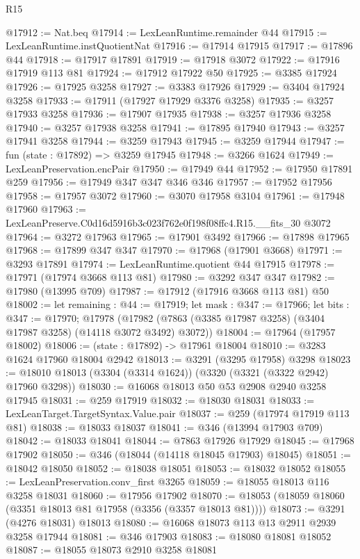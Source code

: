 \begin{lexlean}{R15}
\begin{coremodule}
@17912 := Nat.beq
@17914 := LexLeanRuntime.remainder @44
@17915 := LexLeanRuntime.instQuotientNat
@17916 := @17914 @17915
@17917 := @17896 @44
@17918 := @17917 @17891
@17919 := @17918 @3072
@17922 := @17916 @17919 @113 @81
@17924 := @17912 @17922 @50
@17925 := @3385 @17924
@17926 := @17925 @3258
@17927 := @3383 @17926
@17929 := @3404 @17924 @3258
@17933 := @17911 (@17927 @17929 @3376 @3258)
@17935 := @3257 @17933 @3258
@17936 := @17907 @17935
@17938 := @3257 @17936 @3258
@17940 := @3257 @17938 @3258
@17941 := @17895 @17940
@17943 := @3257 @17941 @3258
@17944 := @3259 @17943
@17945 := @3259 @17944
@17947 := fun (state : @17892) => @3259 @17945
@17948 := @3266 @1624
@17949 := LexLeanPreservation.encPair
@17950 := @17949 @44
@17952 := @17950 @17891 @259
@17956 := @17949 @347 @347 @346 @346
@17957 := @17952 @17956
@17958 := @17957 @3072
@17960 := @3070 @17958 @3104
@17961 := @17948 @17960
@17963 := LexLeanPreserve.C0d16d5916b3c023f762e0f198f08ffc4.R15.__fits_30 @3072
@17964 := @3272 @17963
@17965 := @17901 @3492
@17966 := @17898 @17965
@17968 := @17899 @347 @347
@17970 := @17968 (@17901 @3668)
@17971 := @3293 @17891
@17974 := LexLeanRuntime.quotient @44 @17915
@17978 := @17971 (@17974 @3668 @113 @81)
@17980 := @3292 @347 @347
@17982 := @17980 (@13995 @709)
@17987 := @17912 (@17916 @3668 @113 @81) @50
@18002 := let remaining : @44 := @17919;
  let mask : @347 := @17966;
  let bits : @347 := @17970;
  @17978 (@17982 (@7863 (@3385 @17987 @3258) (@3404 @17987 @3258) (@14118 @3072 @3492) @3072))
@18004 := @17964 (@17957 @18002)
@18006 := (state : @17892) -> @17961 @18004
@18010 := @3283 @1624 @17960 @18004 @2942
@18013 := @3291 (@3295 @17958) @3298
@18023 := @18010 @18013 (@3304 (@3314 @1624)) (@3320 (@3321 (@3322 @2942) @17960 @3298))
@18030 := @16068 @18013 @50 @53 @2908 @2940 @3258 @17945
@18031 := @259 @17919
@18032 := @18030 @18031
@18033 := LexLeanTarget.TargetSyntax.Value.pair
@18037 := @259 (@17974 @17919 @113 @81)
@18038 := @18033 @18037
@18041 := @346 (@13994 @17903 @709)
@18042 := @18033 @18041
@18044 := @7863 @17926 @17929
@18045 := @17968 @17902
@18050 := @346 (@18044 (@14118 @18045 @17903) @18045)
@18051 := @18042 @18050
@18052 := @18038 @18051
@18053 := @18032 @18052
@18055 := LexLeanPreservation.conv_first @3265
@18059 := @18055 @18013 @116 @3258 @18031
@18060 := @17956 @17902
@18070 := @18053 (@18059 @18060 (@3351 @18013 @81 @17958 (@3356 (@3357 @18013 @81))))
@18073 := @3291 (@4276 @18031) @18013
@18080 := @16068 @18073 @113 @13 @2911 @2939 @3258 @17944
@18081 := @346 @17903
@18083 := @18080 @18081 @18052
@18087 := @18055 @18073 @2910 @3258 @18081

\end{coremodule}
\end{lexlean}
